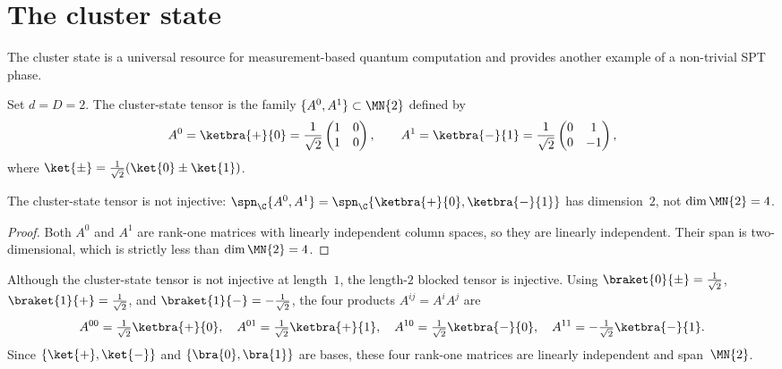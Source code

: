 \section{The cluster state}\label{sec:cluster}

The cluster state is a universal resource for measurement-based quantum
computation and provides another example of a non-trivial SPT phase.

\begin{definition}\label{def:cluster_tensor}
    \notready
    Set $d = D = 2$.  The cluster-state tensor is the family
    $\{A^0, A^1\} \subset \MN{2}$ defined by
    \[
        A^0 = \ketbra{+}{0}
        = \frac{1}{\sqrt{2}}
        \begin{pmatrix} 1 & 0 \\ 1 & 0 \end{pmatrix},
        \qquad
        A^1 = \ketbra{-}{1}
        = \frac{1}{\sqrt{2}}
        \begin{pmatrix} 0 & 1 \\ 0 & -1 \end{pmatrix},
    \]
    where $\ket{\pm} = \tfrac{1}{\sqrt{2}}(\ket{0} \pm \ket{1})$.
\end{definition}

\begin{theorem}\label{thm:cluster_not_injective}
    \notready
    The cluster-state tensor is not injective:
    $\spn_{\C}\{A^0, A^1\} = \spn_{\C}\{\ketbra{+}{0}, \ketbra{-}{1}\}$
    has dimension~$2$, not $\dim \MN{2} = 4$.
\end{theorem}

\begin{proof}
    Both $A^0$ and $A^1$ are rank-one matrices with linearly
    independent column spaces, so they are linearly independent.
    Their span is two-dimensional, which is strictly less than
    $\dim \MN{2} = 4$.
\end{proof}

\begin{remark}\label{rem:cluster_injective_blocked}
    Although the cluster-state tensor is not injective at length~$1$,
    the length-$2$ blocked tensor is injective.  Using
    $\braket{0}{\pm} = \tfrac{1}{\sqrt{2}}$,
    $\braket{1}{+} = \tfrac{1}{\sqrt{2}}$, and
    $\braket{1}{-} = -\tfrac{1}{\sqrt{2}}$, the
    four products $A^{ij} = A^i A^j$ are
    \[
        A^{00} = \tfrac{1}{\sqrt{2}}\ketbra{+}{0},\quad
        A^{01} = \tfrac{1}{\sqrt{2}}\ketbra{+}{1},\quad
        A^{10} = \tfrac{1}{\sqrt{2}}\ketbra{-}{0},\quad
        A^{11} = -\tfrac{1}{\sqrt{2}}\ketbra{-}{1}.
    \]
    Since $\{\ket{+},\ket{-}\}$ and $\{\bra{0},\bra{1}\}$ are bases,
    these four rank-one matrices are linearly independent and
    span~$\MN{2}$.
\end{remark}

